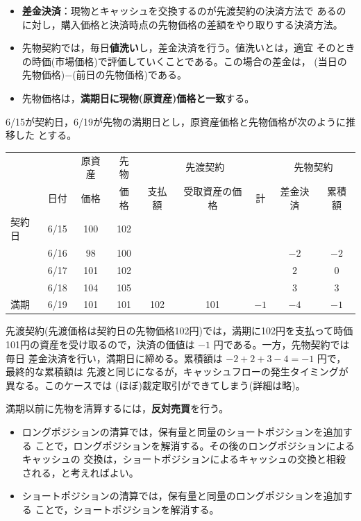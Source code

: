 \begin{itemize}
\item \textbf{差金決済}：現物とキャッシュを交換するのが先渡契約の決済方法で
あるのに対し，購入価格と決済時点の先物価格の差額をやり取りする決済方法。
\item 先物契約では，毎日\textbf{値洗い}し，差金決済を行う。値洗いとは，適宜
そのときの時価(市場価格)で評価していくことである。この場合の差金は，
(当日の先物価格)$-$(前日の先物価格)である。
\item 先物価格は，\textbf{満期日に現物(原資産)価格と一致}する。
\end{itemize}

\begin{example}[先渡契約と先物契約のキャッシュフロー]
6/15が契約日，6/19が先物の満期日とし，原資産価格と先物価格が次のように推移した
とする。
\vspace{0.9em}
\begin{center}
\small
\begin{tabular}{llcc|ccc|cc}
\toprule
 & & 原資産 & 先物 & \multicolumn{3}{c|}{先渡契約} & \multicolumn{2}{c}{先物契約}\\
 & 日付 & 価格 & 価格 & 支払額 & 受取資産の価格 & 計 & 差金決済 & 累積額\\
\midrule
契約日 & 6/15 & 100 & 102 & & & & &\\
 & 6/16 & 98 & 100 & & & & $-2$ & $-2$\\
 & 6/17 & 101 & 102 & & & & $2$ & $0$\\
 & 6/18 & 104 & 105 & & & & $3$ & $3$\\
満期 & 6/19 & 101 & 101 & 102 & 101 & $-1$ & $-4$ & $-1$\\
\bottomrule
\end{tabular}
\end{center}
\vspace{0.9em}
先渡契約(先渡価格は契約日の先物価格102円)では，満期に102円を支払って時価
101円の資産を受け取るので，決済の価値は $-1$ 円である。一方，先物契約では毎日
差金決済を行い，満期日に締める。累積額は $-2+2+3-4 = -1$ 円で，最終的な累積額は
先渡と同じになるが，キャッシュフローの発生タイミングが異なる。このケースでは
(ほぼ)裁定取引ができてしまう(詳細は略)。
\end{example}

満期以前に先物を清算するには，\textbf{反対売買}を行う。
\begin{itemize}
\item ロングポジションの清算では，保有量と同量のショートポジションを追加する
ことで，ロングポジションを解消する。その後のロングポジションによるキャッシュの
交換は，ショートポジションによるキャッシュの交換と相殺される，と考えればよい。
\item ショートポジションの清算では，保有量と同量のロングポジションを追加する
ことで，ショートポジションを解消する。
\end{itemize}

